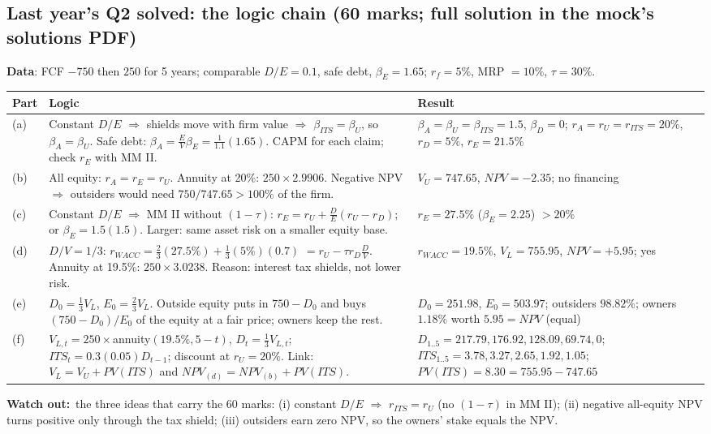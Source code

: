 \documentclass[10pt,a4paper]{article}
\newcommand{\blk}[1]{\subsection*{\color{hd}#1}}
\newcommand{\watch}{\par\noindent\textbf{\color{wr}Watch out:}~}
\begin{document}
\blk{Last year's Q2 solved: the logic chain (60 marks; full solution in the mock's solutions PDF)}
\textbf{Data}: FCF $-750$ then $250$ for 5 years; comparable $D/E=0.1$, safe debt, $\beta_E=1.65$;
$r_f=5\%$, MRP $=10\%$, $\tau=30\%$.
\begin{center}\small
\begin{tabularx}{\linewidth}{@{}>{\raggedright\arraybackslash}p{1.1cm}>{\raggedright\arraybackslash}p{6.6cm}Y@{}}
  \toprule
  Part & Logic & Result \\ \midrule
  (a) & Constant $D/E$ $\Rightarrow$ shields move with firm value $\Rightarrow$ $\beta_{ITS}=\beta_U$,
        so $\beta_A=\beta_U$. Safe debt: $\beta_A=\frac EV\beta_E=\frac{1}{1.1}(1.65)$. CAPM for each
        claim; check $r_E$ with MM II. &
        $\beta_A=\beta_U=\beta_{ITS}=1.5$, $\beta_D=0$; $r_A=r_U=r_{ITS}=20\%$, $r_D=5\%$,
        $r_E=21.5\%$ \\[2pt]
  (b) & All equity: $r_A=r_E=r_U$. Annuity at 20\%: $250\times2.9906$. Negative NPV $\Rightarrow$
        outsiders would need $750/747.65>100\%$ of the firm. &
        $V_U=747.65$, $NPV=-2.35$; no financing \\[2pt]
  (c) & Constant $D/E$ $\Rightarrow$ MM II without $(1-\tau)$: $r_E=r_U+\frac DE(r_U-r_D)$;
        or $\beta_E=1.5(1.5)$. Larger: same asset risk on a smaller equity base. &
        $r_E=27.5\%$ ($\beta_E=2.25$) $>20\%$ \\[2pt]
  (d) & $D/V=1/3$: $r_{WACC}=\frac23(27.5\%)+\frac13(5\%)(0.7)$ $=r_U-\tau r_D\frac DV$.
        Annuity at 19.5\%: $250\times3.0238$. Reason: interest tax shields, not lower risk. &
        $r_{WACC}=19.5\%$, $V_L=755.95$, $NPV=+5.95$; yes \\[2pt]
  (e) & $D_0=\frac13V_L$, $E_0=\frac23V_L$. Outside equity puts in $750-D_0$ and buys
        $(750-D_0)/E_0$ of the equity at a fair price; owners keep the rest. &
        $D_0=251.98$, $E_0=503.97$; outsiders $98.82\%$; owners $1.18\%$ worth $5.95=NPV$ (equal) \\[2pt]
  (f) & $V_{L,t}=250\times$annuity$(19.5\%,5-t)$, $D_t=\frac13V_{L,t}$; $ITS_t=0.3(0.05)D_{t-1}$;
        discount at $r_U=20\%$. Link: $V_L=V_U+PV(ITS)$ and $NPV_{(d)}=NPV_{(b)}+PV(ITS)$. &
        $D_{1..5}=217.79, 176.92, 128.09, 69.74, 0$; $ITS_{1..5}=3.78, 3.27, 2.65, 1.92, 1.05$;
        $PV(ITS)=8.30=755.95-747.65$ \\ \bottomrule
\end{tabularx}
\end{center}
\watch the three ideas that carry the 60 marks: (i) constant $D/E$ $\Rightarrow$ $r_{ITS}=r_U$ (no
$(1-\tau)$ in MM II); (ii) negative all-equity NPV turns positive only through the tax shield;
(iii) outsiders earn zero NPV, so the owners' stake equals the NPV.
\end{document}
